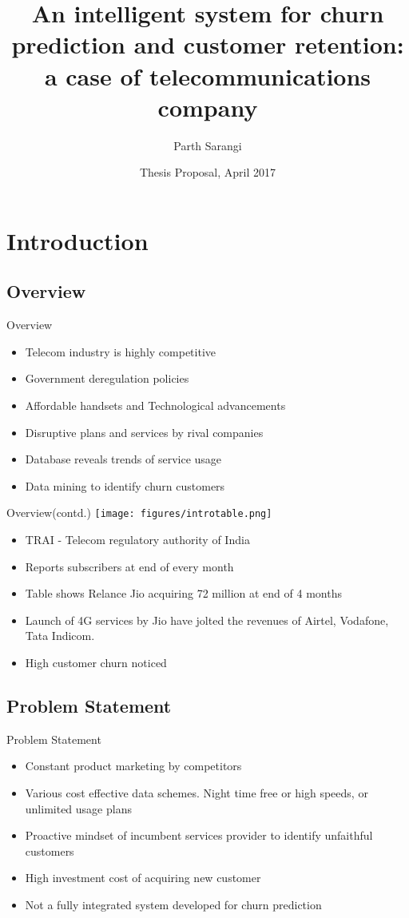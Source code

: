 \documentclass{beamer}
\title{
		{An intelligent system for churn prediction and customer retention: a case of telecommunications company }
	}
\author{Parth Sarangi}%
\institute[Asian Institute of Technology Thailand] %
{
  Computer Science and Information Management\\
  Asian Institute of Technology Thailand
  }
\date{Thesis Proposal, April 2017}
\begin{document}
\begin{frame}
  \titlepage
\end{frame}

\section{Introduction}

\subsection{Overview}
\begin{frame}{Overview}
	\begin{itemize}
		\item Telecom industry is highly competitive
		\item Government deregulation policies
		\item Affordable handsets and Technological advancements
		\item Disruptive plans and services by rival companies
		\item Database reveals trends of service usage
		\item Data mining to identify churn customers
	\end{itemize}
\end{frame}

\begin{frame}{Overview(contd.)}
	\texttt{[image: figures/introtable.png]}
	\begin{itemize}
		\item TRAI - Telecom regulatory authority of India
		\item Reports subscribers at end of every month
		\item Table shows Relance Jio acquiring 72 million at end of 4 months
		\item Launch of 4G services by Jio have jolted the revenues of Airtel, Vodafone, Tata Indicom.
		\item High customer churn noticed
	\end{itemize}
\end{frame}

\subsection{Problem Statement}
\begin{frame}{Problem Statement}
	\begin{itemize}
		\item Constant product marketing by competitors
		\item Various cost effective data schemes. Night time free or high speeds, or unlimited usage plans
		\item Proactive mindset of incumbent services provider to identify unfaithful customers
		\item High investment cost of acquiring new customer
		\item Not a fully integrated system developed for churn prediction
	\end{itemize}
\end{frame}
\end{document}
